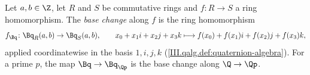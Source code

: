 Let $a,b\in\Z$, let $R$ and $S$ be commutative rings and $f\colon R\to S$ a ring homomorphism. The \emph{base change} along $f$ is the ring homomorphism
\[
  f_{\Bq}\colon\Bq_R(a,b)\to\Bq_S(a,b),\qquad x_0+x_1i+x_2j+x_3k\longmapsto f(x_0)+f(x_1)i+f(x_2)j+f(x_3)k,
\]
applied coordinatewise in the basis $1,i,j,k$ (\cref{III.qalg.def:quaternion-algebra}). For a prime $p$, the map $\Bq\to\Bq_{\Qp}$ is the base change along $\Q\to\Qp$.
